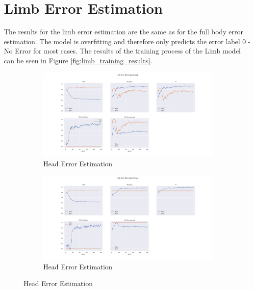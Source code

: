 \section{Limb Error Estimation}
\label{sec:limb_error_estimation}

The results for the limb error estimation are the same as for the full body error estimation. The model is overfitting and therefore only predicts the error label $0$ - No Error for most cases. The results of the training process of the Limb model can be seen in Figure \ref{fig:limb_training_results}.


\begin{figure}
  \centering
  \begin{subfigure}[b]{0.9\linewidth}
      \centering
      \includegraphics[width=\textwidth]{figures/Results/lb/LimbErrorEstimation_Head.png}
      \caption{Head Error Estimation}
      \label{fig:head_lb_ee}
  \end{subfigure}
  \hfill
  \begin{subfigure}[b]{0.9\linewidth}
      \centering
      \includegraphics[width=\textwidth]{figures/Results/lb/LimbErrorEstimation_Torso.png}
      \caption{Head Error Estimation}
      \label{fig:torso_lb_ee}
  \end{subfigure}

\end{figure}

